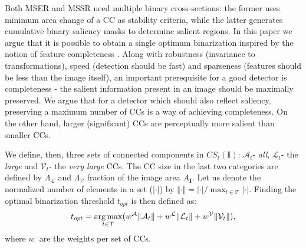 \documentclass[conference,compsoc]{IEEEtran}
\def\I{{\mathbf I}}
\def\mcT{{\mathcal{T}}}
\def\mcA{{\mathcal{A}}}
\def\mcL{{\mathcal{L}}}
\def\mcV{{\mathcal{V}}}
\DeclareMathOperator*{\argmax}{arg\,max}
\begin{document}
Both MSER and MSSR need multiple binary cross-sections: the former uses minimum area change of a CC as stability criteria, while the latter generates cumulative binary saliency masks to determine salient regions. In this paper we argue that it is possible to obtain a single optimum binarization inspired by the notion of feature completeness \cite{Dickscheid2011}. Along with robustness (invariance to transformations), speed (detection should be fast) and sparseness (features should be less than the image itself), an important prerequisite for a good detector is completeness - the salient information present in an image should be maximally preserved. We argue that for a detector which should also reflect saliency, preserving a maximum number of CCs is a way of achieving completeness. On the other hand, larger (significant) CCs are perceptually more salient than smaller CCs. 

We define, then, three sets of connected components in $CS_t(\I)$: $\mcA_t$- {\em all}, $\mcL_t$- the {\em large} and $\mcV_t$- the {\em very large} CCs.  The CC size in the last two categories are defined by $\Lambda_{\mcL}$ and $\Lambda_{\mcV}$ fraction of the image area $A_{\I}$. Let us denote the normalized number of elements in a set ($|\cdot|$) by $\Vert \cdot \Vert = |\cdot| / \max_{t \in \mcT}|\cdot|$.
Finding the optimal binarization threshold $t_{opt}$ is then defined as:
\begin{equation} \label{eq:bin}
\vspace{-0.05cm}
t_{opt} = \argmax_{t \in \mcT}( w^{\mcA} \Vert \mcA_t \Vert + w^{\mcL} \Vert \mcL_t \Vert + w^{\mcV} \Vert \mcV_t \Vert ),
\vspace{-0.05cm}
\end{equation}
where $w^{\cdot}$ are the weights per set of CCs.  
\end{document}
